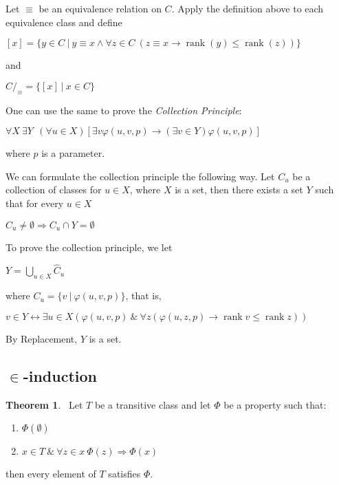 \documentclass[8pt]{article}
\theoremstyle{definition}
\theoremstyle{definition}
\newtheorem{theorem}{Theorem}[section]
\theoremstyle{definition}
\theoremstyle{definition}
\theoremstyle{definition}
\theoremstyle{definition}
\theoremstyle{definition}
\theoremstyle{definition}
\theoremstyle{definition}
\theoremstyle{definition}
\theoremstyle{definition}
\theoremstyle{definition}
\theoremstyle{definition}
\theoremstyle{definition}
\theoremstyle{question}
\begin{document}
Let $\equiv$ be an equivalence relation on $C$. Apply the definition above to each equivalence class and define
\begin{center}
  $[x] = \{ y \in C \: | \: y \equiv x \land \forall z \in C \: (z \equiv x \to \operatorname{rank}(y) \leq \operatorname{rank}(z)) \}$
\end{center}
and
\begin{center} 
$C/_{\equiv} = \{ [x] \: | \: x \in C \}$
\end{center}

One can use the same to prove the \emph{Collection Principle}:
\begin{center}
  $\forall X \: \exists Y \:\: (\forall u \in X) [\exists v \varphi(u, v, p) \to (\exists v \in Y) \varphi(u, v, p)]$
\end{center}
where $p$ is a parameter.

We can formulate the collection principle the following way. 
Let $C_u$ be a collection of classes for $u \in X$, where $X$ is a set, then
there exists a set $Y$ such that for every $u \in X$
\begin{center}
  $C_u \neq \emptyset \Rightarrow C_u \cap Y = \emptyset$
\end{center}

To prove the collection principle, we let
\begin{center}
  $Y = \bigcup \limits_{u \in X} \hat{C}_u$
\end{center}
where $C_u = \{ v \: | \: \varphi(u, v, p) \}$, that is, 
\begin{center}
  $v \in Y \leftrightarrow \exists u \in X (\varphi(u, v, p) \: \& \: \forall z (\varphi(u, z, p) \to \operatorname{rank} v \leq \operatorname{rank} z))$
\end{center}

By Replacement, $Y$ is a set.

\subsection{$\in$-induction}

\begin{theorem}~\label{in:ind}
  Let $T$ be a transitive class and let $\Phi$ be a property such that:
  \begin{enumerate}
    \item $\Phi(\emptyset)$
    \item $x \in T \: \& \: \forall z \in x \: \Phi(z) \Rightarrow \Phi(x)$
  \end{enumerate}
  then every element of $T$ satisfies $\Phi$.
\end{theorem}
\end{document}

